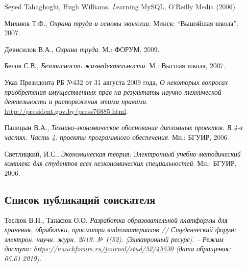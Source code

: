 \begin{thebibliography}{}
\bibitem{}
  Seyed Tahaghoghi, Hugh Williams,
  \emph Learning MySQL,
  O'Reilly Media (2006)

  Михнюк Т.Ф.,
  \emph{Охрана труда и основы экологии}.
  Минск: ``Вышэйшая школа'',
  2007.

  Девисилов В.А.,
  \emph{Охрана труда}.
  М.: ФОРУМ,
  2009.

  Белов С.В.,
  \emph{Безопасность жизнедеятельности}.
  М.: Высшая школа,
  2007.

  Указ Президента РБ №432 от 31 августа 2009 года,
  \emph{О некоторых вопросах приобретения имущественных прав на результаты научно-технической деятельности и распоряжения этими правами}.
  \href{http://president.gov.by/press76885.html}{http://president.gov.by/press76885.html}.

  Палицын В.А.,
  \emph{Технико-экономическое обоснование дипломных проектов. В 4-х частях. Часть 4: проекты программного обеспечения}.
  Мн.: БГУИР,
  2006.

  Светлицкий, И.С.,
  \emph{Экономическая теория: Электронный учебно-методический комплекс для студентов всех неэкономических специальностей}.
  Мн.: БГУИР,
  2006.

\end{thebibliography}

\subsection*{Список публикаций соискателя}

\begin{thebibliography}{}

\bibitem{}
  Теслюк В.Н., Танасюк О.О.
  \emph{Разработка образовательной платформы для хранения, обработки, просмотра видеоматериалов
  // Студенческий форум: электрон. научн. журн. 2019. № 1(52).
  [Электронный ресурс]. – Режим доступа:
  \href{https://nauchforum.ru/journal/stud/52/45530}{https://nauchforum.ru/journal/stud/52/45530}
  (дата обращения: 05.01.2019).}

\end{thebibliography}{}

\endgroup